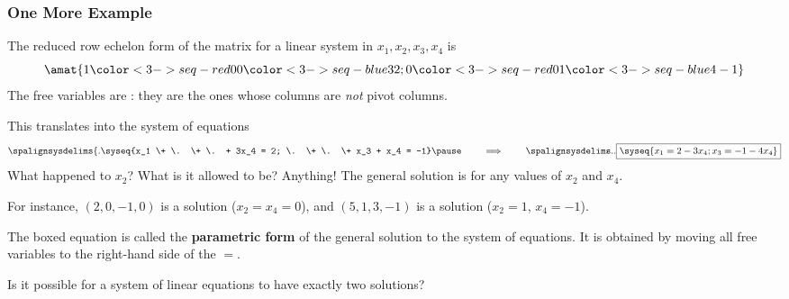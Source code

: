 \begin{frame}
\frametitle{One More Example}

\vskip-1mm
The reduced row echelon form of the matrix for a linear system in
$x_1,x_2,x_3,x_4$ is
\[ \amat{
    1 \color<3->{seq-red}0 0 \color<3->{seq-blue}3 2 ;
    0 \color<3->{seq-red}0 1 \color<3->{seq-blue}4 -1
  } \]
\pause
The free variables are
:
\pause
they are the ones whose
columns are \emph{not} pivot columns.

\pause\medskip
This translates into the system of equations
\[ \spalignsysdelims\{.
\syseq{x_1 \+ \. \+ \. + 3x_4 = 2;
  \.  \+ \. \+ x_3 + x_4 = -1} 
\pause\qquad\implies\qquad\spalignsysdelims..
\framebox{$\syseq{x_1 = 2 - 3x_4; x_3 = -1 - 4x_4\llap.}$}\]
\pause
What happened to $x_2$?  What is it allowed to be?
\pause
Anything!  The general solution is
\webonlycmd{
\[ (x_1,\,x_2,\,x_3,\,x_4) = (2-3x_4,\,x_2,\,-1-4x_4,\,x_4) \]
}%
for any values of $x_2$ and $x_4$.
\begin{webonly}
  For instance, $(2,0,-1,0)$ is a solution ($x_2=x_4=0$), and
  $(5,1,3,-1)$ is a solution ($x_2=1$, $x_4=-1$).
\end{webonly}

\pause
\begin{bluebox}{.8\linewidth}
  The boxed equation is called the \textbf{parametric form} of the general solution to
  the system of equations.  It is obtained by moving all free variables to the
  right-hand side of the $=$.
\end{bluebox}

\end{frame}



\begin{pollframe}

\vskip 1cm

\begin{bluebox}[Poll]{.6\textwidth}
  Is it possible for a system of linear equations to have exactly two solutions?
\end{bluebox}


\end{pollframe}



